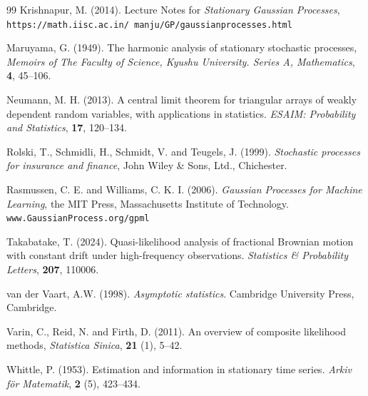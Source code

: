 \documentclass[a4paper,10pt,twoside]{article}
\numberwithin{equation}{section}
\begin{document}
\begin{thebibliography}{99}
 Krishnapur, M. (2014). Lecture Notes for {\it Stationary Gaussian Processes}, {\tt https://math.iisc.ac.in/~manju/GP/gaussianprocesses.html}

 Maruyama, G. (1949). The harmonic analysis of stationary stochastic processes, {\it Memoirs of The Faculty of Science, Kyushu University. Series A, Mathematics}, {\bf 4}, 45--106.

 Neumann, M. H. (2013). A central limit theorem for triangular arrays of weakly dependent random variables, with applications in statistics. {\it ESAIM: Probability and Statistics}, {\bf 17}, 120--134.

 Rolski, T., Schmidli, H., Schmidt, V. and Teugels, J. (1999). {\it Stochastic processes for insurance and finance}, John Wiley \& Sons, Ltd., Chichester.

 Rasmussen, C. E. and Williams, C. K. I. (2006). {\it Gaussian Processes for Machine Learning}, the MIT Press, Massachusetts Institute of Technology. {\tt www.GaussianProcess.org/gpml}

 Takabatake, T. (2024). Quasi-likelihood analysis of fractional Brownian motion with constant drift under high-frequency observations. {\it Statistics \& Probability Letters}, {\bf 207}, 110006.

 van der Vaart, A.W. (1998). {\it Asymptotic statistics}. Cambridge University Press, Cambridge.

 Varin, C., Reid, N. and Firth, D. (2011). An overview of composite likelihood methods, {\it Statistica Sinica}, {\bf 21} (1), 5--42.

 Whittle, P. (1953). Estimation and information in stationary time series. {\it Arkiv f\"or Matematik}, {\bf 2} (5), 423--434.







\end{thebibliography}
\end{document}
